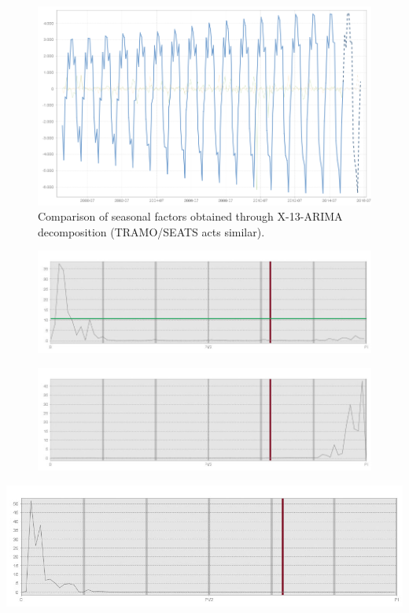 \documentclass[english,blauw]{cbsdiscussionpaper}
\begin{document}
\begin{figure}[H]
\includegraphics[width=\linewidth]{../images/capitolo4/X13_seas_cmp_plan.jpg}
\caption{Comparison of seasonal factors obtained through X-13-ARIMA decomposition (TRAMO/SEATS acts similar).}
\label{fig:X13_seas}
\end{figure}
\begin{figure}[H]
\includegraphics[width=\linewidth]{../images/capitolo4/TSresper.jpg}
\end{figure}
\begin{figure}[H]
\includegraphics[width=\linewidth]{../images/capitolo4/TSirrper.jpg}
\end{figure}
\includegraphics[width=\linewidth]{../images/capitolo4/TSsaper.jpg}
\end{document}
